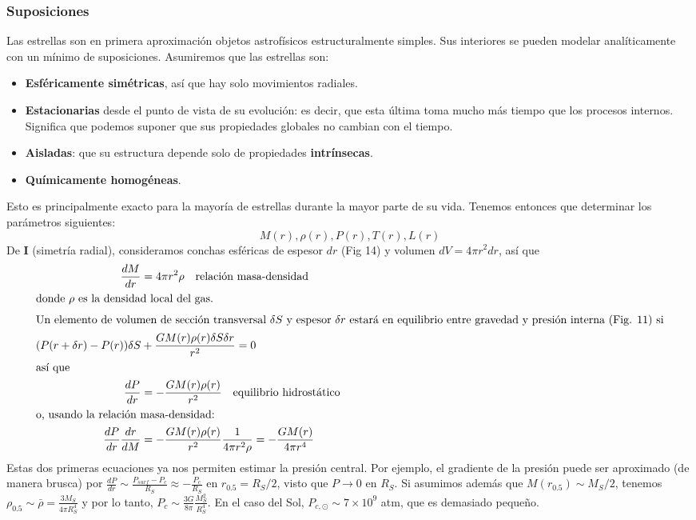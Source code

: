 \documentclass[11pt,letterpaper]{article}
\begin{document}
\subsubsection{Suposiciones}
Las estrellas son en primera aproximación objetos astrofísicos estructuralmente simples. Sus interiores se pueden modelar analíticamente con un mínimo de suposiciones. Asumiremos que las estrellas son:
    \begin{itemize}
        \item \textbf{Esféricamente simétricas}, así que hay solo movimientos radiales.
        \item \textbf{Estacionarias} desde el punto de vista de su evolución: es decir, que esta última toma mucho más tiempo que los procesos internos. Significa que podemos suponer que sus propiedades globales no cambian con el tiempo.
        \item \textbf{Aisladas}: que su estructura depende solo de propiedades \textbf{intrínsecas}.
        \item \textbf{Químicamente homogéneas}.
    \end{itemize}
Esto es principalmente exacto para la mayoría de estrellas durante la mayor parte de su vida. Tenemos entonces que determinar los parámetros siguientes:
\begin{equation}
    M(r), \rho(r), P(r), T(r), L(r)
\end{equation} 
De \textbf{I} (simetría radial), consideramos conchas esféricas de espesor $dr$ (Fig 14) y volumen $dV = 4\pi r^2 dr$, así que
\begin{align}
    \frac{dM}{dr} &= 4\pi r^2 \rho \quad \text{relación masa-densidad}\\
    \intertext{donde $\rho$ es la densidad local del gas.}
    \intertext{Un elemento de volumen de sección transversal $\delta S$ y espesor $\delta r$ estará en equilibrio entre gravedad y presión interna (Fig. 11) si}
    (P (r + \delta r) - P(r))\delta S &+ \frac{GM(r)\rho(r)\delta S \delta r}{r^2} = 0 \\
    \intertext{así que}
    \frac{dP}{dr} &= -\frac{GM(r)\rho(r)}{r^2} \quad \text{equilibrio hidrostático} \\
    \intertext{o, usando la relación masa-densidad:}
    \frac{dP}{dr} \frac{dr}{dM} &= -\frac{GM(r)\rho (r)}{r^2} \frac{1}{4\pi r^2 \rho} = -\frac{GM(r)}{4\pi r^4} \\
\end{align} 
Estas dos primeras ecuaciones ya nos permiten estimar la presión central. Por ejemplo, el gradiente de la presión puede ser aproximado (de manera brusca) por $\frac{dP}{dr} \sim \frac{P_{surf}-P_c}{R_S} \approx -\frac{P_c}{R_S}$ en $r_{0.5}=R_S/2$, visto que $P \to 0$ en $R_S$. Si asumimos además que $M(r_{0.5}) \sim M_S/2$, tenemos $\rho_{0.5} \sim \bar{\rho} = \frac{3M_S}{4\pi R^4_S}$
y por lo tanto, $P_c \sim \frac{3G}{8\pi}\frac{M_S^2}{R_S^4}$. En el caso del Sol, $P_{c,\odot} \sim 7 \times 10^9$ atm, que es demasiado pequeño.
\end{document}
